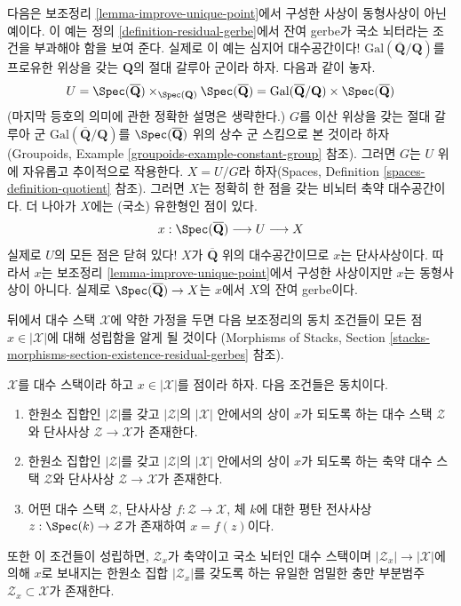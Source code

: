 \begin{example}
\label{example-distinct}
다음은 보조정리 \ref{lemma-improve-unique-point}에서 구성한 사상이
동형사상이 아닌 예이다. 이 예는 정의 \ref{definition-residual-gerbe}에서
잔여 gerbe가 국소 뇌터라는 조건을 부과해야 함을 보여 준다.
실제로 이 예는 심지어 대수공간이다!
$\text{Gal}(\overline{\mathbf{Q}}/\mathbf{Q})$를 프로유한 위상을 갖는
$\mathbf{Q}$의 절대 갈루아 군이라 하자. 다음과 같이 놓자.
$$
U =
\Spec(\overline{\mathbf{Q}})
\times_{\Spec(\mathbf{Q})}
\Spec(\overline{\mathbf{Q}}) =
\text{Gal}(\overline{\mathbf{Q}}/\mathbf{Q}) \times
\Spec(\overline{\mathbf{Q}})
$$
(마지막 등호의 의미에 관한 정확한 설명은 생략한다.)
$G$를 이산 위상을 갖는 절대 갈루아 군
$\text{Gal}(\overline{\mathbf{Q}}/\mathbf{Q})$를
$\Spec(\overline{\mathbf{Q}})$ 위의 상수 군 스킴으로 본 것이라 하자
(Groupoids, Example \ref{groupoids-example-constant-group} 참조).
그러면 $G$는 $U$ 위에 자유롭고 추이적으로 작용한다.
$X = U/G$라 하자(Spaces, Definition \ref{spaces-definition-quotient} 참조).
그러면 $X$는 정확히 한 점을 갖는 비뇌터 축약 대수공간이다.
더 나아가 $X$에는 (국소) 유한형인 점이 있다.
$$
x :
\Spec(\overline{\mathbf{Q}}) \longrightarrow
U \longrightarrow X
$$
실제로 $U$의 모든 점은 닫혀 있다!
$X$가 $\overline{\mathbf{Q}}$ 위의 대수공간이므로 $x$는 단사사상이다.
따라서 $x$는 보조정리 \ref{lemma-improve-unique-point}에서 구성한 사상이지만
$x$는 동형사상이 아니다. 실제로
$\Spec(\overline{\mathbf{Q}}) \to X$는 $x$에서 $X$의 잔여 gerbe이다.
\end{example}

\noindent
뒤에서 대수 스택 $\mathcal{X}$에 약한 가정을 두면 다음 보조정리의
동치 조건들이 모든 점 $x \in |\mathcal{X}|$에 대해 성립함을 알게 될 것이다
(Morphisms of Stacks, Section
\ref{stacks-morphisms-section-existence-residual-gerbes} 참조).

\begin{lemma}
\label{lemma-residual-gerbe}
$\mathcal{X}$를 대수 스택이라 하고 $x \in |\mathcal{X}|$를 점이라 하자.
다음 조건들은 동치이다.
\begin{enumerate}
\item 한원소 집합인 $|\mathcal{Z}|$를 갖고 $|\mathcal{Z}|$의
$|\mathcal{X}|$ 안에서의 상이 $x$가 되도록 하는 대수 스택
$\mathcal{Z}$와 단사사상 $\mathcal{Z} \to \mathcal{X}$가 존재한다.
\item 한원소 집합인 $|\mathcal{Z}|$를 갖고 $|\mathcal{Z}|$의
$|\mathcal{X}|$ 안에서의 상이 $x$가 되도록 하는 축약 대수 스택
$\mathcal{Z}$와 단사사상 $\mathcal{Z} \to \mathcal{X}$가 존재한다.
\item 어떤 대수 스택 $\mathcal{Z}$, 단사사상
$f : \mathcal{Z} \to \mathcal{X}$, 체 $k$에 대한 평탄 전사사상
$z : \Spec(k) \to \mathcal{Z}$가 존재하여 $x = f(z)$이다.
\end{enumerate}
또한 이 조건들이 성립하면, $\mathcal{Z}_x$가 축약이고 국소 뇌터인
대수 스택이며 $|\mathcal{Z}_x| \to |\mathcal{X}|$에 의해 $x$로 보내지는
한원소 집합 $|\mathcal{Z}_x|$를 갖도록 하는 유일한 엄밀한 충만 부분범주
$\mathcal{Z}_x \subset \mathcal{X}$가 존재한다.
\end{lemma}

